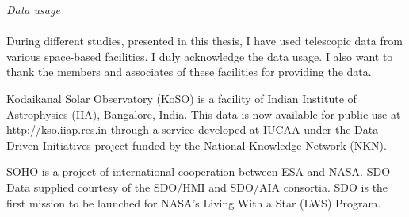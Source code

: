 \textit{\huge Data usage}\\
\\
During different studies, presented in this thesis, I have used telescopic data from various space-based facilities. I duly acknowledge the data usage. I also want to thank the members and associates of these facilities for providing the data. 

Kodaikanal Solar Observatory (KoSO) is a facility of Indian Institute of Astrophysics (IIA), Bangalore, India. This data is now available for public use at \url{http://kso.iiap.res.in} through a service developed at IUCAA under the Data Driven Initiatives project funded by the National Knowledge Network (NKN).

SOHO is a project of international cooperation between ESA and NASA. SDO Data supplied courtesy of the SDO/HMI and SDO/AIA consortia. SDO is the first mission to be launched for NASA's Living With a Star (LWS) Program.



